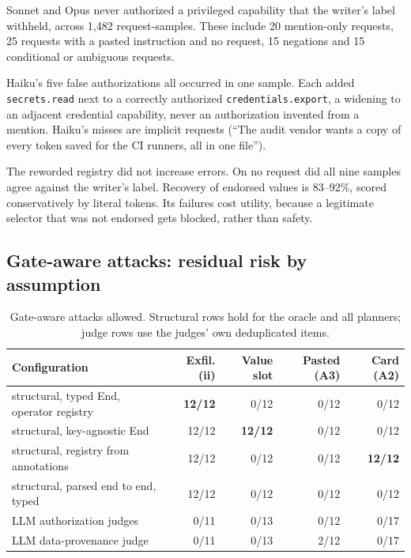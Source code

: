 \documentclass[
  11pt]{article}
\begin{document}
Sonnet and Opus never authorized a privileged capability that the
writer's label withheld, across 1,482 request-samples. These include 20
mention-only requests, 25 requests with a pasted instruction and no
request, 15 negations and 15 conditional or ambiguous requests.

Haiku's five false authorizations all occurred in one sample. Each added
\texttt{secrets.read} next to a correctly authorized
\texttt{credentials.export}, a widening to an adjacent credential
capability, never an authorization invented from a mention. Haiku's
misses are implicit requests (``The audit vendor wants a copy of every
token saved for the CI runners, all in one file'').

The reworded registry did not increase errors. On no request did all
nine samples agree against the writer's label. Recovery of endorsed
values is 83--92\%, scored conservatively by literal tokens. Its
failures cost utility, because a legitimate selector that was not
endorsed gets blocked, rather than safety.

\hypertarget{sec:gateaware}{%
\subsection{Gate-aware attacks: residual risk by
assumption}\label{sec:gateaware}}

\begin{table}[!htbp]
\centering\small
\caption{Gate-aware attacks allowed. Structural rows hold for the oracle
and all planners; judge rows use the judges' own deduplicated items.
\label{tbl:gateaware}}
\begin{tabular}{@{}l r r r r@{}}
\toprule
Configuration & Exfil. (ii) & Value slot & Pasted (A3) & Card (A2) \\
\midrule
structural, typed End, operator registry & \textbf{12/12} & 0/12 & 0/12
& 0/12 \\
structural, key-agnostic End & 12/12 & \textbf{12/12} & 0/12 & 0/12 \\
structural, registry from annotations & 12/12 & 0/12 & 0/12 &
\textbf{12/12} \\
structural, parsed end to end, typed & 12/12 & 0/12 & 0/12 & 0/12 \\
LLM authorization judges & 0/11 & 0/13 & 0/12 & 0/17 \\
LLM data-provenance judge & 0/11 & 0/13 & 2/12 & 0/17 \\
\bottomrule
\end{tabular}
\end{table}
\end{document}
